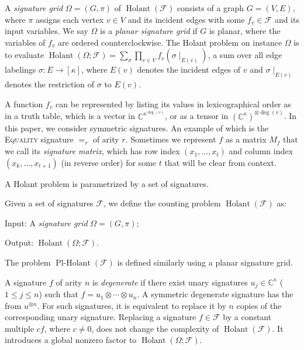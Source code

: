 \documentclass[11pt]{article}
\newcommand{\Holant}{\operatorname{Holant}}
\newcommand{\PlHolant}{\operatorname{Pl-Holant}}
\begin{document}
A \emph{signature grid} $\Omega = (G, \pi)$ of $\Holant(\mathcal{F})$ consists of a graph $G = (V,E)$,
where $\pi$ assigns each vertex $v \in V$ and its incident edges with some $f_v \in \mathcal{F}$ and its input variables.
We say $\Omega$ is a \emph{planar signature grid} if $G$ is planar,
where the variables of $f_v$ are ordered counterclockwise.
The Holant problem on instance $\Omega$ is to evaluate $\Holant(\Omega; \mathcal{F}) = \sum_{\sigma} \prod_{v \in V} f_v(\sigma \mid_{E(v)})$,
a sum over all edge labelings $\sigma: E \to [\kappa]$,
where $E(v)$ denotes the incident edges of $v$ and $\sigma \mid_{E(v)}$ denotes the restriction of $\sigma$ to $E(v)$.

A function $f_v$ can be represented by listing its values in lexicographical order as in a truth table,
which is a vector in $\mathbb{C}^{\kappa^{\deg(v)}}$,
or as a tensor in $(\mathbb{C}^{\kappa})^{\otimes \deg(v)}$.
In this paper, we consider symmetric signatures.
An example of which is the \textsc{Equality} signature $=_r$ of arity $r$.
Sometimes we represent $f$ as a matrix $M_f$ that we call its \emph{signature matrix},
which has row index $(x_1, \dotsc, x_t)$ and column index $(x_k, \dotsc, x_{t+1})$ (in reverse order) for some $t$ that will be clear from context.

A Holant problem is parametrized by a set of signatures.

\begin{definition}
 Given a set of signatures $\mathcal{F}$,
 we define the counting problem $\Holant(\mathcal{F})$ as:

 Input: A \emph{signature grid} $\Omega = (G, \pi)$;

 Output: $\Holant(\Omega; \mathcal{F})$.
\end{definition}

\noindent
The problem $\PlHolant(\mathcal{F})$ is defined similarly using a planar signature grid.

A signature $f$ of arity $n$ is \emph{degenerate} if there exist unary signatures $u_j \in \mathbb{C}^\kappa$ ($1 \le j \le n$)
such that $f = u_1 \otimes \cdots \otimes u_n$.
A symmetric degenerate signature has the from $u^{\otimes n}$.
For such signatures, it is equivalent to replace it by $n$ copies of the corresponding unary signature.
Replacing a signature $f \in \mathcal{F}$ by a constant multiple $c f$,
where $c \ne 0$, does not change the complexity of $\Holant(\mathcal{F})$.
It introduces a global nonzero factor to $\Holant(\Omega; \mathcal{F})$.
\end{document}

